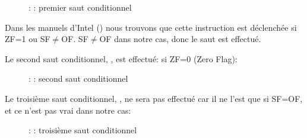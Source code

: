\begin{figure}[H]
\centering
{}
\caption{\olly: : premier saut conditionnel}
\label{fig:jcc_olly_signed_1}
\end{figure}

Dans les manuels d'Intel () nous trouvons que cette instruction
est déclenchée si ZF=1 ou SF$\neq$OF.
SF$\neq$OF dans notre cas, donc le saut est effectué.

\clearpage
Le second saut conditionnel, \JNZ, est effectué: si ZF=0 (Zero Flag):

\begin{figure}[H]
\centering
{}
\caption{\olly: : second saut conditionnel}
\label{fig:jcc_olly_signed_2}
\end{figure}

\clearpage
Le troisième saut conditionnel, \JGE, ne sera pas effectué car il ne l'est que
si SF=OF, et ce n'est pas vrai dans notre cas:

\begin{figure}[H]
\centering
{}
\caption{\olly: : troisième saut conditionnel}
\label{fig:jcc_olly_signed_3}
\end{figure}
